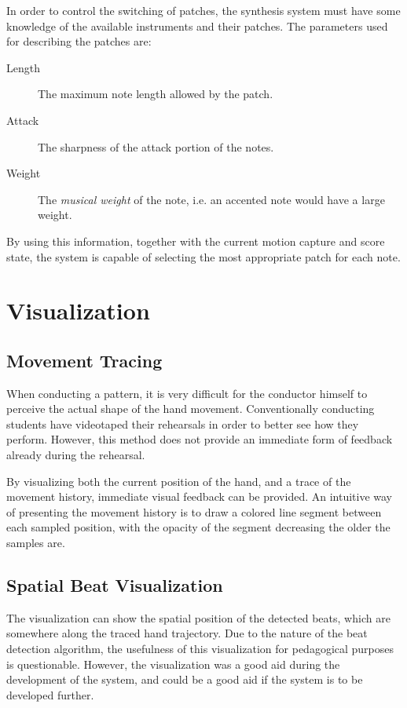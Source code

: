 In order to control the switching of patches,
the synthesis system must have some knowledge of
the available instruments and their patches.
The parameters used for describing the patches are:
\begin{description}
\item[Length] The maximum note length allowed by the patch.
\item[Attack] The sharpness of the attack portion of the notes.
\item[Weight] The \textit{musical weight} of the note, i.e. an accented note would have a large weight.
\end{description}
By using this information,
together with the current motion capture and score state,
the system is capable of selecting
the most appropriate patch for each note.


\chapter{Visualization}
\label{chapter:visualization}


\section{Movement Tracing}

When conducting a pattern,
it is very difficult for the conductor himself to
perceive the actual shape of the hand movement.
Conventionally conducting students have
videotaped their rehearsals in order to better see how they perform.
However, this method does not provide an immediate form of feedback 
already during the rehearsal.

By visualizing both the current position of the hand,
and a trace of the movement history,
immediate visual feedback can be provided.
An intuitive way of presenting the movement history
is to draw a colored line segment between each sampled position,
with the opacity of the segment decreasing the older the samples are.

\section{Spatial Beat Visualization}

The visualization can show the spatial position
of the detected beats,
which are somewhere along the traced hand trajectory.
Due to the nature of the beat detection algorithm,
the usefulness of this visualization for
pedagogical purposes is questionable.
However, the visualization was a good aid
during the development of the system,
and could be a good aid if the system is to be developed further.


